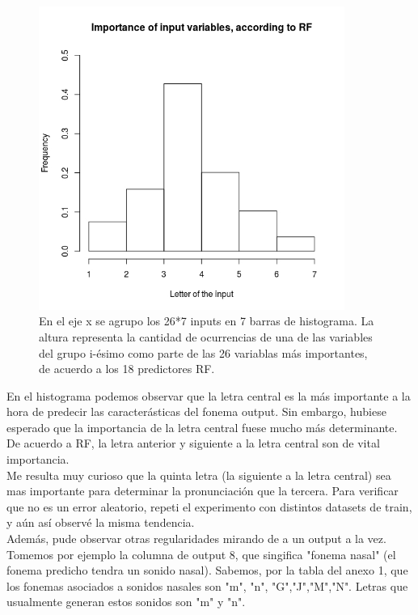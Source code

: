 \documentclass[paper=a4, fontsize=11pt]{scrartcl} %
\numberwithin{equation}{section} %
\numberwithin{figure}{section} %
\numberwithin{table}{section} %
\begin{document}
\begin{figure}[h!]
\centering
\includegraphics[width=100mm]{variable_importance.jpg}
\caption{En el eje x se agrupo los 26*7 inputs en 7 barras de histograma. La altura representa la cantidad de ocurrencias de una de las variables del grupo i-ésimo como parte de las 26 variablas más importantes, de acuerdo a los 18 predictores RF.}
\label{fig:results}

\end{figure}

En el histograma podemos observar que la letra central es la más importante a la hora de predecir las caracterásticas del fonema output. Sin embargo, hubiese esperado que la importancia de la letra central fuese mucho más determinante. De acuerdo a RF, la letra anterior y siguiente a la letra central son de vital importancia. \\

Me resulta muy curioso que la quinta letra (la siguiente a la letra central) sea mas importante para determinar la pronunciación que la tercera. Para verificar que no es un error aleatorio, repeti el experimento con distintos datasets de train, y aún así observé la misma tendencia. \\

Además, pude observar otras regularidades mirando de a un output a la vez. Tomemos por ejemplo la columna de output 8, que singifica "fonema nasal" (el fonema predicho tendra un sonido nasal). Sabemos, por la tabla del anexo 1, que los fonemas asociados a sonidos nasales son "m", "n", "G","J","M","N". Letras que usualmente generan estos sonidos son "m" y "n". \\
\end{document}
